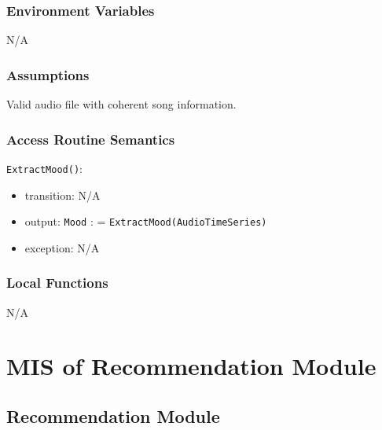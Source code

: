 \documentclass[12pt, titlepage]{article}
\begin{document}
\subsubsection{Environment Variables}
N/A

\subsubsection{Assumptions}
Valid audio file with coherent song information.

\subsubsection{Access Routine Semantics}

\noindent \texttt{ExtractMood()}:
\begin{itemize}
\item transition: N/A 
\item output: \texttt{Mood} : = \texttt{ExtractMood(Audio\textunderscore Time\textunderscore Series)}
\item exception: N/A
\end{itemize}

\subsubsection{Local Functions}
N/A

\section{MIS of Recommendation Module} 

\subsection{Recommendation Module}

\end{document}
